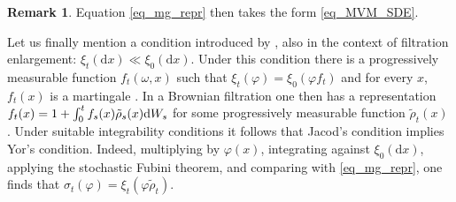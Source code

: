 \documentclass{article}
\theoremstyle{definition}
\newtheorem{remark}[theorem]{\textbf{Remark}}
\numberwithin{equation}{section}
\numberwithin{theorem}{section}
\newcommand{\dx}{\mathrm{d}x}
\newcommand{\Cov}{\mathbb{C}\mathrm{ov}}
\renewcommand{\d}{{\rm d}}
\begin{document}
\begin{remark}
Equation \eqref{eq_mg_repr} then takes the form \eqref{eq_MVM_SDE}.

Let us finally mention a condition introduced by \cite{jacod1985}, also in the context of filtration enlargement: $\xi_t(\dx)\ll \xi_0(\dx)$. Under this condition there is a progressively measurable function $f_t(\omega,x)$ such that $\xi_t(\varphi)=\xi_0(\varphi f_t)$ and for every $x$, $f_t(x)$ is a martingale \cite[Lemma~1.8]{jacod1985}. In a Brownian filtration one then has a representation $f_t(x)=1+\int_0^t f_s(x) \tilde\rho_s(x) \d W_s$ for some progressively measurable function $\tilde\rho_t(x)$ \cite[Proposition~3.14]{jacod1985}. Under suitable integrability conditions it follows that Jacod's condition implies Yor's condition. Indeed, multiplying by $\varphi(x)$, integrating against $\xi_0(\dx)$, applying the stochastic Fubini theorem, and comparing with \eqref{eq_mg_repr}, one finds that $\sigma_t(\varphi)=\xi_t(\varphi \tilde\rho_t)$.
\end{remark}

\end{document}

